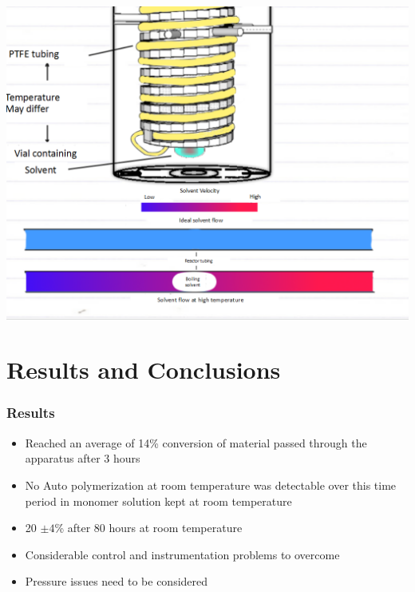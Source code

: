 \documentclass[10pt, compress]{beamer}
\begin{document}
\begin{frame}
\begin{center}
\includegraphics[width=\textwidth]{problems.png}\end{center}
\end{frame}

\section{Results and Conclusions}

\begin{frame}
\frametitle{Results}
\begin{itemize}
    \item {Reached an average of 14\% conversion of material passed through the apparatus after 3 hours}
    \item {No Auto polymerization at room temperature was detectable over this time period in  monomer solution kept at room temperature}
    \item { 20 $\pm 4$\% after 80 hours at room temperature}
    \item { Considerable control and instrumentation problems to overcome}
    \item { Pressure issues need to be considered}
\end{itemize}
\end{frame}
\end{document}
